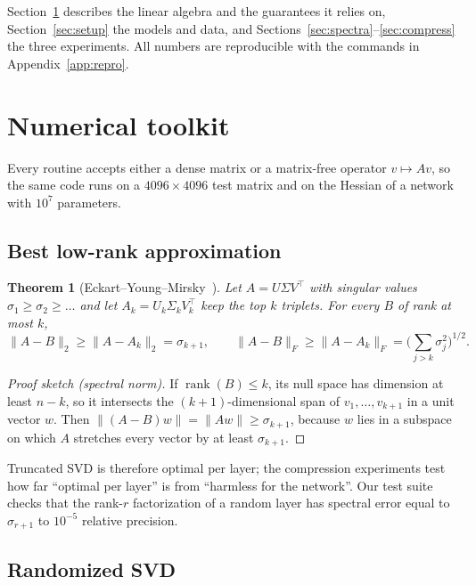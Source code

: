 \documentclass[11pt]{article}
\newtheorem{theorem}{Theorem}
\theoremstyle{definition}
\begin{document}
Section~\ref{sec:toolkit} describes the linear algebra and the guarantees it relies on,
Section~\ref{sec:setup} the models and data, and Sections~\ref{sec:spectra}--\ref{sec:compress}
the three experiments. All numbers are reproducible with the commands in
Appendix~\ref{app:repro}.

\section{Numerical toolkit}
\label{sec:toolkit}

Every routine accepts either a dense matrix or a matrix-free operator $v \mapsto Av$, so the same
code runs on a $4096 \times 4096$ test matrix and on the Hessian of a network with $10^7$
parameters.

\subsection{Best low-rank approximation}

\begin{theorem}[Eckart--Young--Mirsky~\cite{eckart1936}]
Let $A = U\Sigma V^\top$ with singular values $\sigma_1 \ge \sigma_2 \ge \dots$ and let
$A_k = U_k \Sigma_k V_k^\top$ keep the top $k$ triplets. For every $B$ of rank at most $k$,
\[
\|A - B\|_2 \ge \|A - A_k\|_2 = \sigma_{k+1},
\qquad
\|A - B\|_F \ge \|A - A_k\|_F = \Big(\sum_{j>k} \sigma_j^2\Big)^{1/2}.
\]
\end{theorem}

\begin{proof}[Proof sketch (spectral norm)]
If $\operatorname{rank}(B) \le k$, its null space has dimension at least $n-k$, so it intersects
the $(k+1)$-dimensional span of $v_1,\dots,v_{k+1}$ in a unit vector $w$. Then
$\|(A-B)w\| = \|Aw\| \ge \sigma_{k+1}$, because $w$ lies in a subspace on which $A$ stretches every
vector by at least $\sigma_{k+1}$.
\end{proof}

Truncated SVD is therefore optimal per layer; the compression experiments test how far
``optimal per layer'' is from ``harmless for the network''. Our test suite checks that the rank-$r$
factorization of a random layer has spectral error equal to $\sigma_{r+1}$ to $10^{-5}$ relative
precision.

\subsection{Randomized SVD}
\end{document}
